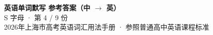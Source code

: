 \documentclass[10pt,a4paper]{article}
\begin{document}
\pagestyle{plain}

\begin{center}
{\LARGE\bfseries 英语单词默写 \quad 参考答案（中 $\to$ 英）}\\[0.22em]
{\large S 字母 · 第 4 / 9 份}\\[0.18em]
{\small 2026年上海市高考英语词汇用法手册 · 参照普通高中英语课程标准}
\end{center}

\vspace{0.2em}
\noindent{\color{rulegray}\rule{\textwidth}{0.8pt}}

\vspace{0.35em}

\vspace{0.25em}
\renewcommand{\arraystretch}{1.32}
\end{document}
